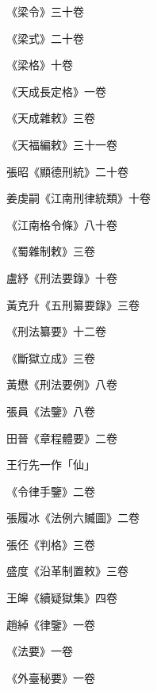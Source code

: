\begin{pinyinscope}
 《梁令》三十卷



 《梁式》二十卷



 《梁格》十卷



 《天成長定格》一卷



 《天成雜敕》三卷



 《天福編敕》三十一卷



 張昭《顯德刑統》二十卷



 姜虔嗣《江南刑律統類》十卷



 《江南格令條》八十卷



 《蜀雜制敕》三卷



 盧紓《刑法要錄》十卷



 黃克升《五刑纂要錄》三卷



 《刑法纂要》十二卷



 《斷獄立成》三卷



 黃懋《刑法要例》八卷



 張員《法鑒》八卷



 田晉《章程體要》二卷



 王行先一作「仙」



 《令律手鑒》二卷



 張履冰《法例六贓圖》二卷



 張伾《判格》三卷



 盛度《沿革制置敕》三卷



 王皞《續疑獄集》四卷



 趙綽《律鑒》一卷



 《法要》一卷



 《外臺秘要》一卷




\end{pinyinscope}
